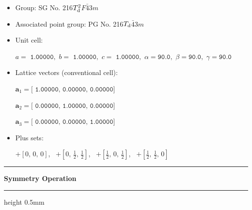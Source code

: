\documentclass[fleqn,10pt,landscape]{jsarticle}
\begin{document}
\begin{itemize}
\item Group: SG No. 216\quad$T_{\rm d}^{2}$\quad$F\bar{4}3m$\quad[ cubic ]
\item Associated point group: PG No. 216\quad$T_{\rm d}$\quad$\bar{4}3m$\quad[ cubic ]
\end{itemize}
\begin{itemize}
\item Unit cell:

\quad $a=\texttt{ 1.00000},\,\, b=\texttt{ 1.00000},\,\, c=\texttt{ 1.00000},\,\, \alpha=\texttt{90.0},\,\, \beta=\texttt{90.0},\,\, \gamma=\texttt{90.0}$

\item Lattice vectors (conventional cell):

\quad $\bm{a}_1=\texttt{[ 1.00000, 0.00000, 0.00000]}$

\quad $\bm{a}_2=\texttt{[ 0.00000, 1.00000, 0.00000]}$

\quad $\bm{a}_3=\texttt{[ 0.00000, 0.00000, 1.00000]}$

\item Plus sets:

\quad $+\left[ 0,\, 0,\, 0 \right]$,\,\,\, $+\left[ 0,\, \frac{1}{2},\, \frac{1}{2} \right]$,\,\,\, $+\left[ \frac{1}{2},\, 0,\, \frac{1}{2} \right]$,\,\,\, $+\left[ \frac{1}{2},\, \frac{1}{2},\, 0 \right]$

\end{itemize}
\vspace{5mm}
\noindent \rule[0.5mm]{5mm}{0.5mm}\hspace{3mm}\textbf{Symmetry Operation}\hspace{3mm}\leaders\hrule height 0.5mm\hfill\kern0pt
\vspace{3mm}
\end{document}
